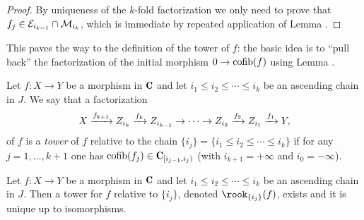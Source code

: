 \documentclass[a4paper,12pt]{amsart}
\begin{document}
\begin{proof}
By uniqueness of the $k$-fold factorization we only need to prove that $f_j\in \mathcal{E}_{i_{k-1}}\cap \mathcal{M}_{i_k}$, which is immediate by repeated application of Lemma . 
\end{proof}
This paves the way to the definition of the tower of $f$: the basic idea is to ``pull back'' the factorization of the initial morphism $0\to \operatorname{cofib}(f)$ using Lemma .
\begin{definition} \label{tower.of.f}Let $f\colon X\to Y$ be a morphism in $\C$ and let $i_1\leq i_2\leq\cdots \leq i_k$ be an ascending chain in $J$. We say that a factorization 
\[
X \xrightarrow{f_{k+1}} Z_{i_k} \xrightarrow{f_k}Z_{i_{k-1}}\to\dots\to Z_{i_{2}} \xrightarrow{f_2} Z_{i_1} \xrightarrow{f_1} Y,
\]
of $f$ is a \emph{tower} of $f$ relative to the chain $\{i_j\} = \{i_1\leq i_2\leq\cdots \leq i_k\}$ if for any $j=1,\dots,k+1$ one has
$\cofib(f_j)\in \C_{[i_{j-1},i_j)}$ (with $i_{k+1}=+\infty$ and $i_0=-\infty$).
\end{definition}
\begin{proposition}\label{prop:perPostnikov} Let $f\colon X\to Y$ be a morphism in $\C$ and let $i_1\leq i_2\leq\cdots \leq i_k$ be an ascending chain in $J$. Then a tower for $f$ relative to $\{i_j\}$, denoted $\rook_{\{i_j\}}(f)$, exists and it is unique up to isomorphisms.
\end{proposition}
\end{document}
